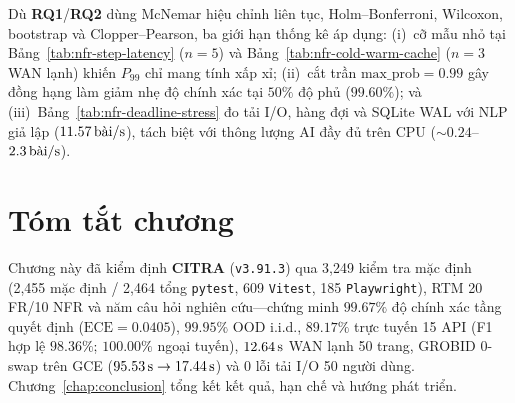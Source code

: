Dù \textbf{RQ1}/\textbf{RQ2} dùng McNemar hiệu chỉnh liên tục, Holm--Bonferroni, Wilcoxon, bootstrap và Clopper--Pearson, ba giới hạn thống kê áp dụng: (i)~cỡ mẫu nhỏ tại Bảng~\ref{tab:nfr-step-latency} ($n = 5$) và Bảng~\ref{tab:nfr-cold-warm-cache} ($n = 3$ WAN lạnh) khiến $P_{99}$ chỉ mang tính xấp xỉ; (ii)~cắt trần $\text{max\_prob} = 0.99$ gây đồng hạng làm giảm nhẹ độ chính xác tại $50\%$ độ phủ ($99.60\%$); và (iii)~Bảng~\ref{tab:nfr-deadline-stress} đo tải I/O, hàng đợi và SQLite WAL với NLP giả lập ($11.57\text{\,bài/s}$), tách biệt với thông lượng AI đầy đủ trên CPU ($\sim 0.24$--$2.3\text{\,bài/s}$).

\section{Tóm tắt chương}

Chương này đã kiểm định \textbf{CITRA} (\texttt{v3.91.3}) qua 3,249 kiểm tra mặc định (2,455 mặc định / 2,464 tổng \texttt{pytest}, 609 \texttt{Vitest}, 185 \texttt{Playwright}), RTM 20 FR/10 NFR và năm câu hỏi nghiên cứu---chứng minh $99.67\%$ độ chính xác tầng quyết định ($\text{ECE} = 0.0405$), $99.95\%$ OOD i.i.d., $89.17\%$ trực tuyến 15 API (F1 hợp lệ $98.36\%$; $100.00\%$ ngoại tuyến), $12.64\text{\,s}$ WAN lạnh 50 trang, GROBID 0-swap trên GCE ($95.53\text{\,s} \rightarrow 17.44\text{\,s}$) và 0 lỗi tải I/O 50 người dùng. Chương~\ref{chap:conclusion} tổng kết kết quả, hạn chế và hướng phát triển.
